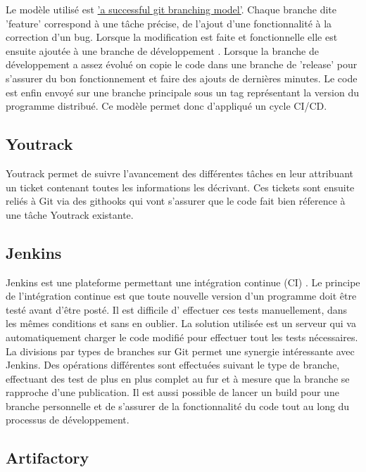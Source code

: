 \documentclass[french,a4paper,12pt]{report}
\begin{document}
Le modèle utilisé est \href{https://nvie.com/posts/a-successful-git-branching-model/}{'a successful git branching model'}. Chaque branche dite 'feature' correspond à une tâche précise, de l'ajout d'une fonctionnalité à la correction d'un bug. Lorsque la modification est faite et fonctionnelle elle est ensuite ajoutée à une branche de développement . Lorsque la branche de développement a assez évolué on copie le code dans une branche de 'release' pour s'assurer du bon fonctionnement et faire des ajouts de dernières minutes. Le code est enfin envoyé sur une branche principale sous un tag représentant la version du programme distribué.
Ce modèle permet donc d'appliqué un cycle CI/CD.

\subsection{Youtrack}

Youtrack permet de suivre l'avancement des différentes tâches en leur attribuant un ticket contenant toutes les informations les décrivant.
Ces tickets sont ensuite reliés à Git via des githooks qui vont s'assurer que le code fait bien réference à une tâche Youtrack existante.

\subsection{Jenkins}

Jenkins est une plateforme permettant une intégration continue (CI) . Le principe de l’intégration continue est que toute nouvelle version d’un programme doit être testé avant d’être posté. Il est difficile d' effectuer ces tests manuellement, dans les mêmes conditions et sans en oublier. La solution utilisée est un serveur qui va automatiquement charger le code modifié pour effectuer tout les tests nécessaires. La divisions par types de branches sur Git permet une synergie intéressante avec Jenkins. Des opérations différentes sont effectuées suivant le type de branche, effectuant des test de plus en plus complet au fur et à mesure que la branche se rapproche d'une publication. Il est aussi possible de lancer un build pour une branche personnelle et de s’assurer de la fonctionnalité du code tout au long du processus de développement.

\subsection{Artifactory}
\end{document}
